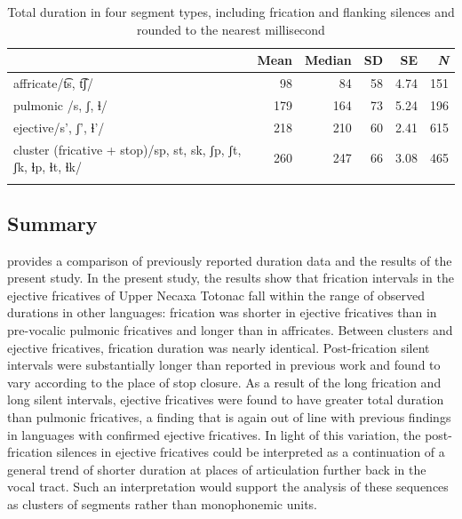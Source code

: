 \documentclass[output=paper,colorlinks,citecolor=brown]{langscibook}
\begin{document}
\begin{table}
	\caption[Total duration in four phone types]{Total duration in four segment types, including frication and flanking silences and rounded to the nearest millisecond}
	\label{tab:total-dur-summary}

	\begin{tabularx}{\textwidth}{Qrrrrr}
		\lsptoprule
		&{Mean}&{Median}&{SD}&{SE}&{\textit{N}}\\
		\midrule
		affricate\newline /t͡s, t͡ʃ/&98 &84& 58 &4.74&151\\
		\tablevspace
		pulmonic \newline /s, ʃ, ɬ/&179 &164 &73 &5.24&196\\
		\tablevspace
		ejective\newline /s', ʃ', ɬ'/&218 &210 & 60 &2.41&615\\
		\tablevspace
		cluster (fricative + stop)\newline /sp, st, sk, ʃp, ʃt, ʃk, ɬp, ɬt, ɬk/ &260 &247 &66 &3.08&465\\
		\lspbottomrule
	\end{tabularx}
\end{table}

\subsection{Summary}
 provides a comparison of previously reported duration data and the results of the present study. In the present study, the results show that frication intervals in the ejective fricatives of Upper Necaxa Totonac fall within the range of observed durations in other languages: frication was shorter in ejective fricatives than in pre-vocalic pulmonic fricatives and longer than in affricates. Between clusters and ejective fricatives, frication duration was nearly identical. Post-frication silent intervals were substantially longer than reported in previous work and found to vary according to the place of stop closure. As a result of the long frication and long silent intervals, ejective fricatives were found to have greater total duration than pulmonic fricatives, a finding that is again out of line with previous findings in languages with confirmed ejective fricatives. In light of this variation, the post-frication silences in ejective fricatives could be interpreted as a continuation of a general trend of shorter duration at places of articulation further back in the vocal tract. Such an interpretation would support the analysis of these sequences as clusters of segments rather than monophonemic units.
\end{document}
